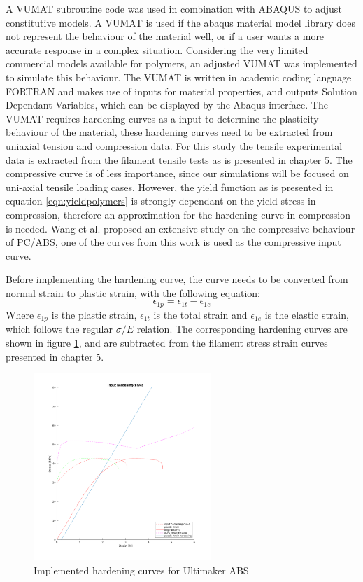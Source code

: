 A VUMAT subroutine code was used in combination with ABAQUS to adjust constitutive models. A VUMAT is used if the abaqus material model library does not represent the behaviour of the material well, or if a user wants a more accurate response in a complex situation\cite{SimuliaWriting}. Considering the very limited commercial models available for polymers, an adjusted VUMAT was implemented to simulate this behaviour. The VUMAT is written in academic coding language FORTRAN and makes use of inputs for material properties, and outputs Solution Dependant Variables, which can be displayed by the Abaqus interface. The VUMAT requires hardening curves as a input to determine the plasticity behaviour of the material, these hardening curves need to be extracted from uniaxial tension and compression data. For this study the tensile experimental data is extracted from the filament tensile tests as is presented in chapter 5. The compressive curve is of less importance, since our simulations will be focused on uni-axial tensile loading cases. However, the yield function as is presented in equation \ref{eqn:yieldpolymers} is strongly dependant on the yield stress in compression, therefore an approximation for the hardening curve in compression is needed. Wang et al. \cite{Wang2016ExperimentalRates} proposed an extensive study on the compressive behaviour of PC/ABS, one of the curves from this work is used as the compressive input curve. 

Before implementing the hardening curve, the curve needs to be converted from normal strain to plastic strain, with the following equation:
\begin{equation} \label{eqn:toplastic}
\epsilon_{1p}=\epsilon_{1t}-\epsilon_{1e}
\end{equation}
Where $\epsilon_{1p}$ is the plastic strain, $\epsilon_{1t}$ is the total strain and $\epsilon_{1e}$ is the elastic strain, which follows the regular $\sigma/E$ relation. The corresponding hardening curves are shown in figure \ref{fig:hardening}, and are subtracted from the filament stress strain curves presented in chapter 5.

\begin{figure}[H]
    \centering
    \includegraphics[width=0.60\textwidth]{chapter_7_non-elasticmodelling/figures/Hardening.png}
    \caption{Implemented hardening curves for Ultimaker ABS}
    \label{fig:hardening}
\end{figure}

